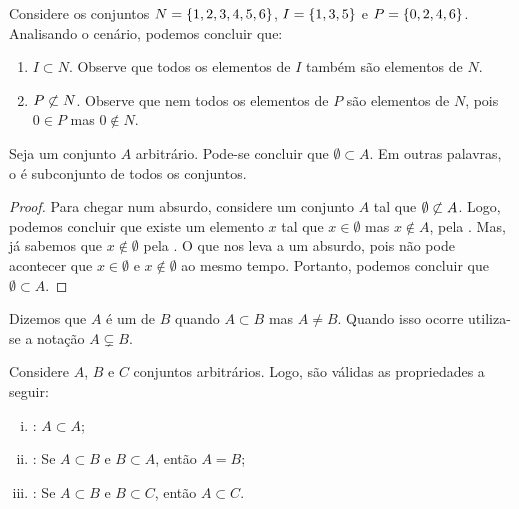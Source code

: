 \begin{example}
Considere os conjuntos $N = \left\{ 1, 2, 3, 4, 5, 6\right\}$, $I = \left\{ 1, 3, 5\right\}$ e $P = \left\{ 0, 2, 4, 6\right\}$.
Analisando o cenário, podemos concluir que:
	\begin{enumerate}
		\item $I \subset N$. Observe que todos os elementos de $I$ também são elementos de $N$.
		\item $P \not\subset N$. Observe que nem todos os elementos de $P$ são elementos de $N$, pois $0 \in P$ mas $0 \notin N$.
	\end{enumerate}
\end{example}

\begin{proposition}
	\label{prop:emptyset1}
Seja um conjunto $A$ arbitrário. Pode-se concluir que $\emptyset \subset A$.
Em outras palavras, o  é subconjunto de todos os conjuntos.
\end{proposition}

\begin{proof}
Para chegar num absurdo, considere um conjunto $A$ tal que $\emptyset \not\subset A$.
Logo, podemos concluir que existe um elemento $x$ tal que $x \in \emptyset$ mas $x \notin A$, pela .
Mas, já sabemos que $x \notin \emptyset$ pela .
O que nos leva a um absurdo, pois não pode acontecer que $x \in \emptyset$ e $x \notin \emptyset$ ao mesmo tempo.
Portanto, podemos concluir que $\emptyset \subset A$.
\end{proof}

\begin{definition}
Dizemos que $A$ é um  de $B$ quando $A \subset B$ mas $A \neq B$. Quando isso ocorre utiliza-se a notação $A \subsetneq B$.
\end{definition}

\begin{proposition}
Considere $A$, $B$ e $C$ conjuntos arbitrários. Logo, são válidas as propriedades a seguir:

\begin{enumerate}[i)]
\item
	\label{inclusao:reflexividade}
	: $A \subset A$;
\item
	\label{inclusao:antissimetria}
	: Se $A \subset B$ e $B \subset A$, então $A = B$;
\item
	\label{inclusao:transitividade}
	: Se $A \subset B$ e $B \subset C$, então $A \subset C$.
\end{enumerate}
\end{proposition}

